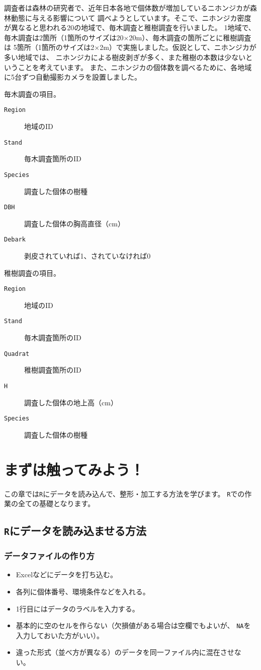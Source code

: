 調査者は森林の研究者で、近年日本各地で個体数が増加しているニホンジカが森林動態に与える影響について
調べようとしています。そこで、ニホンジカ密度が異なると思われる20の地域で、毎木調査と稚樹調査を行いました。
1地域で、毎木調査は2箇所（1箇所のサイズは20$\times$20m）、毎木調査の箇所ごとに稚樹調査は
5箇所（1箇所のサイズは2$\times$2m）で実施しました。仮説として、ニホンジカが多い地域では、
ニホンジカによる樹皮剥ぎが多く、また稚樹の本数は少ないということを考えています。
また、ニホンジカの個体数を調べるために、各地域に5台ずつ自動撮影カメラを設置しました。

毎木調査の項目。
\begin{description}
  \item[\texttt{Region}]地域のID
  \item[\texttt{Stand}]毎木調査箇所のID
  \item[\texttt{Species}]調査した個体の樹種
  \item[\texttt{DBH}]調査した個体の胸高直径（cm）
  \item[\texttt{Debark}]剥皮されていれば1、されていなければ0
\end{description}

稚樹調査の項目。
\begin{description}
  \item[\texttt{Region}]地域のID
  \item[\texttt{Stand}]毎木調査箇所のID
  \item[\texttt{Quadrat}]稚樹調査箇所のID
  \item[\texttt{H}]調査した個体の地上高（cm）
  \item[\texttt{Species}]調査した個体の樹種
\end{description}

\section{まずは触ってみよう！}
\label{begin}
この章では\texttt{R}にデータを読み込んで、整形・加工する方法を学びます。
\texttt{R}での作業の全ての基礎となります。
  
  \subsection{\texttt{R}にデータを読み込ませる方法}
    \subsubsection{データファイルの作り方}
\begin{itemize}
 \item Excelなどにデータを打ち込む。
 \item 各列に個体番号、環境条件などを入れる。
 \item 1行目にはデータのラベルを入力する。
 \item 基本的に空のセルを作らない（欠損値がある場合は空欄でもよいが、
       \verb|NA|を入力しておいた方がいい）。
 \item 違った形式（並べ方が異なる）のデータを同一ファイル内に混在させな
       い。
\end{itemize}

